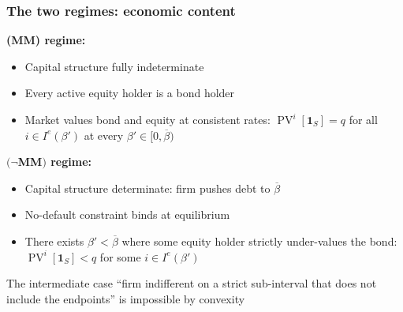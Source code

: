\documentclass[blue]{beamer}
\DeclareMathOperator\PV{PV}
\def\1{\mathbf{1}}
\theoremstyle{definition}
\theoremstyle{example}
\begin{document}
\begin{frame}\frametitle{The two regimes: economic content}
\textbf{(MM) regime:}
\begin{itemize}
\item Capital structure fully indeterminate
\item Every active equity holder is a bond holder
\item Market values bond and equity at consistent rates: $\PV^i[\1_S] = q$ for all $i \in I^e(\beta')$ at every $\beta' \in [0, \overline{\beta})$
\end{itemize}
\bigskip

\textbf{$(\neg$MM$)$ regime:}
\begin{itemize}
\item Capital structure determinate: firm pushes debt to $\overline{\beta}$
\item No-default constraint binds at equilibrium
\item There exists $\beta' < \overline{\beta}$ where some equity holder strictly under-values the bond: $\PV^i[\1_S] < q$ for some $i \in I^e(\beta')$
\end{itemize}
\bigskip

The intermediate case ``firm indifferent on a strict sub-interval that does not include the endpoints'' is \alert{impossible} by convexity
\end{frame}




\end{document}
